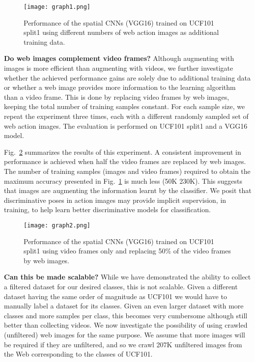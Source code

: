 \documentclass[10pt,twocolumn,letterpaper]{article}
\begin{document}
\begin{figure}[t]
  \center
\texttt{[image: graph1.png]}\\  
  \caption{Performance of the spatial CNNs (VGG16) trained on UCF101 split1 using different numbers of web action images as additional training data.}
 \label{fig:perfNum}
\end{figure}

\vspace{0.1in}
\noindent \textbf{Do web images complement video frames?} Although augmenting with images is more efficient than augmenting with videos, we further investigate whether the achieved performance gains are solely due to additional training data or whether a web image provides more information to the learning algorithm than a video frame. This is done by replacing video frames by web images, keeping the total number of training samples constant. For each sample size, we repeat the experiment three times, each with a different randomly sampled set of web action images. The evaluation is performed on UCF101 split1 and a VGG16 model. 

Fig.~\ref{fig:compExp} summarizes the results of this experiment. A consistent improvement in performance is achieved when half the video frames are replaced by web images. The number of training samples (images and video frames) required to obtain the maximum accuracy presented in Fig.~\ref{fig:perfNum} is much less (50K \vs 230K). This suggests that images are augmenting the information learnt by the classifier. We posit that discriminative poses in action images may provide implicit supervision, in training, to help learn better discriminative models for classification.  



\begin{figure}[t]
  \center
\texttt{[image: graph2.png]}\\  
  \caption{Performance of the spatial CNNs (VGG16) trained on UCF101 split1 using video frames only and replacing 50\% of the video frames by web images.}
 \label{fig:compExp}
\end{figure}



\vspace{0.1in}
\noindent \textbf{Can this be made scalable?} While we have demonstrated the ability to collect a filtered dataset for our desired classes, this is not scalable. Given a different dataset having the same order of magnitude as UCF101 we would have to manually label a dataset for its classes. Given an even larger dataset with more classes and more samples per class, this becomes very cumbersome although still better than collecting videos. 
We now investigate the possibility of using crawled (unfiltered) web images for the same purpose. We assume that more images will be required if they are unfiltered, and so we crawl 207K unfiltered images from the Web corresponding to the classes of UCF101.  
\end{document}
